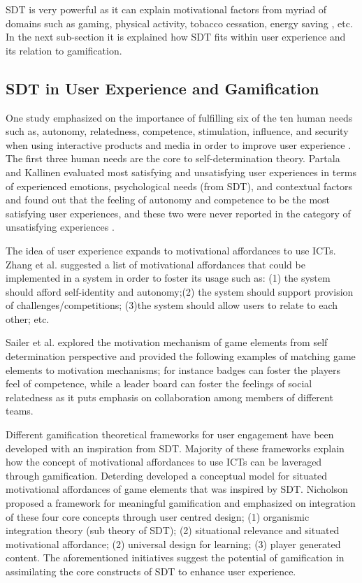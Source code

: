 \documentclass{sig-alternate}
\begin{document}
SDT is very powerful as it can explain motivational factors from myriad of domains such as gaming\cite{ryan2006:motivationalpull}, physical activity\cite{power2011:obesity}, tobacco cessation\cite{williams2006:testing}, energy saving \cite{webb2013:self}, etc. In the next sub-section it is explained how SDT fits within user experience and its relation to gamification.  
\subsection{SDT in User Experience and Gamification}
One study emphasized on the importance of fulfilling six of the ten human needs such as, autonomy, relatedness, competence, stimulation, influence, and security when using interactive products and media in order to improve user experience \cite{wiklund2009:needs}. The first three human needs are the core to self-determination theory. Partala and Kallinen \cite{partala2012:understanding} evaluated most satisfying and unsatisfying user experiences in terms of experienced emotions, psychological needs (from SDT), and contextual factors and found out that the feeling of autonomy and competence to be the most satisfying user experiences, and these two were never reported in the category of unsatisfying experiences \cite{partala2012:understanding}.

The idea of user experience expands to motivational affordances to use ICTs. Zhang et al.\cite{zhang2008:motivational} suggested a list of motivational affordances that could be implemented in a system in order to foster its usage such as: (1) the system should afford self-identity and autonomy;(2) the system should support provision of challenges/competitions; (3)the system should allow users to relate to each other; etc.

Sailer et al.\cite{sailer2013:psychological} explored the motivation mechanism of game elements from self determination perspective and provided the following examples of matching game elements to motivation mechanisms; for instance badges can foster the players feel of competence, while a leader board can foster the feelings of social relatedness as it puts emphasis on collaboration among members of different teams.

Different gamification theoretical frameworks for user engagement have been developed with an inspiration from SDT. Majority of these frameworks explain how the concept of motivational affordances to use ICTs can be laveraged through gamification. Deterding \cite{deterding2011:situated} developed  a conceptual model for situated motivational affordances of game elements that was inspired by SDT. Nicholson \cite{nicholson2012:user} proposed a framework for meaningful gamification and emphasized on integration of these four core concepts through user centred design; (1) organismic integration theory (sub theory of SDT); (2) situational relevance and situated motivational affordance; (2) universal design for learning; (3) player generated content. The aforementioned initiatives suggest the potential of gamification in assimilating the core constructs of SDT to enhance user experience.
\end{document}
